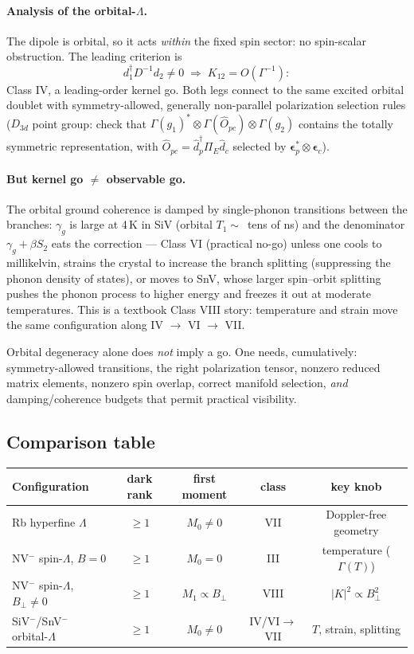 \documentclass[11pt,a4paper]{article}
\theoremstyle{remark}
\begin{document}
\paragraph{Analysis of the orbital-$\Lambda$.}
The dipole is orbital, so it acts \emph{within} the fixed spin sector: no
spin-scalar obstruction. The leading criterion is
\[
d_1^\dagger D^{-1} d_2\neq0
\;\Longrightarrow\;
K_{12}=O(\Gamma^{-1}) :
\]
Class IV, a leading-order kernel go. Both legs connect to the same excited
orbital doublet with symmetry-allowed, generally non-parallel polarization
selection rules ($D_{3d}$ point group: check that
$\Gamma(g_1)^*\otimes\Gamma(\hat O_{pc})\otimes\Gamma(g_2)$ contains the
totally symmetric representation, with
$\hat O_{pc}=\hat d_p^\dagger\Pi_E\hat d_c$ selected by
$\bm\epsilon_p^*\otimes\bm\epsilon_c$).

\paragraph{But kernel go $\neq$ observable go.}
The orbital ground coherence is damped by single-phonon transitions between
the branches: $\gamma_g$ is large at 4\,K in SiV (orbital $T_1\sim$~tens of ns)
and the denominator $\gamma_g+\beta S_2$ eats the correction --- Class VI
(practical no-go) unless one cools to millikelvin, strains the crystal to
increase the branch splitting (suppressing the phonon density of states), or
moves to SnV, whose larger spin--orbit splitting pushes the phonon process to
higher energy and freezes it out at moderate temperatures. This is a textbook
Class VIII story: temperature and strain move the same configuration along
IV $\to$ VI $\to$ VII.

\begin{warningbox}
Orbital degeneracy alone does \emph{not} imply a go. One needs, cumulatively:
symmetry-allowed transitions, the right polarization tensor, nonzero reduced
matrix elements, nonzero spin overlap, correct manifold selection, \emph{and}
damping/coherence budgets that permit practical visibility.
\end{warningbox}

\subsection{Comparison table}

\begin{center}
\renewcommand{\arraystretch}{1.3}
\begin{tabular}{lcccc}
\toprule
Configuration & dark rank & first moment & class & key knob\\
\midrule
Rb hyperfine $\Lambda$ & $\ge1$ & $M_0\neq0$ & VII & Doppler-free geometry\\
NV$^-$ spin-$\Lambda$, $B=0$ & $\ge1$ & $M_0=0$ & III & temperature ($\Gamma(T)$)\\
NV$^-$ spin-$\Lambda$, $B_\perp\!\neq\!0$ & $\ge1$ & $M_1\propto B_\perp$ & VIII & $|K|^2\propto B_\perp^2$\\
SiV$^-$/SnV$^-$ orbital-$\Lambda$ & $\ge1$ & $M_0\neq0$ & IV/VI$\to$VII & $T$, strain, splitting\\
\bottomrule
\end{tabular}
\end{center}
\end{document}

